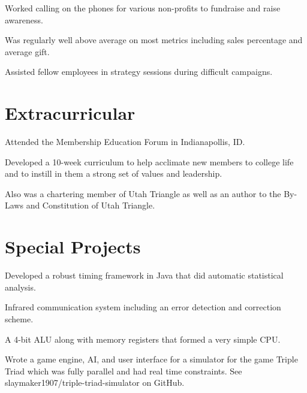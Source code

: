 \documentclass[letterpaper]{deedy-resume} %
\begin{document}
\begin{minipage}[t]{0.64\textwidth}


\begin{tightitemize}
\item Worked calling on the phones for various non-profits to fundraise and raise awareness.
\item Was regularly well above average on most metrics including sales percentage and average gift.
\item Assisted fellow employees in strategy sessions during difficult campaigns.
\end{tightitemize}

\sectionspace %


\section{Extracurricular}

\begin{tightitemize}
\item Attended the Membership Education Forum in Indianapollis, ID.
\item Developed a 10-week curriculum to help acclimate new members to college life and to instill in them a strong set of values and leadership.
\item Also was a chartering member of Utah Triangle as well as an author to the By-Laws and Constitution of Utah Triangle.
\end{tightitemize}

\sectionspace %


\section{Special Projects} 
\begin{tightitemize}
\item Developed a robust timing framework in Java that did automatic statistical analysis.
\item Infrared communication system including an error detection and correction scheme.
\item A 4-bit ALU along with memory registers that formed a very simple CPU.
\item Wrote a game engine, AI, and user interface for a simulator for the game Triple Triad which was fully parallel and had real time constraints. See slaymaker1907/triple-triad-simulator on GitHub.
\end{tightitemize}


\end{minipage}
\end{document}
